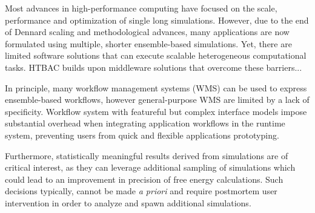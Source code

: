 
Most advances in high-performance computing have focused on the scale,
performance and optimization of single long simulations. However, due to the
end of Dennard scaling and methodological advances, many applications are now
formulated using multiple, shorter ensemble-based simulations. Yet, there are
limited software solutions that can execute scalable heterogeneous
computational tasks. HTBAC builds upon middleware solutions that overcome
these barriers...






In principle, many workflow management systems (WMS) can be used to express
ensemble-based workflows, however general-purpose WMS are limited by a lack of
specificity. Workflow system with featureful but complex interface models
impose substantial overhead when integrating application workflows in the
runtime system, preventing users from quick and flexible applications
prototyping. 

Furthermore, statistically meaningful results derived from simulations are of
critical interest, as they can leverage additional sampling of simulations
which could lead to an improvement in precision of free energy calculations.
Such decisions typically, cannot be made {\it a priori} and require postmortem
user intervention in order to analyze and spawn additional simulations.

